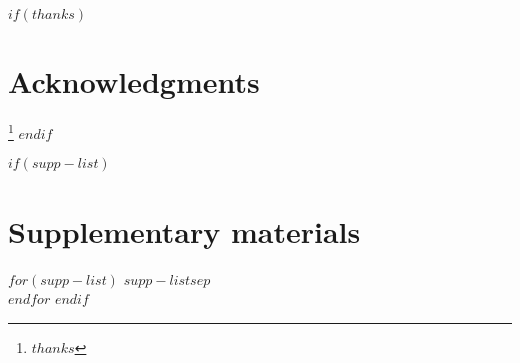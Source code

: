 $if(thanks)$
\section*{Acknowledgments}
\thanks{$thanks$}
$endif$

$if(supp-list)$
\section*{Supplementary materials}
$for(supp-list)$
$supp-list$$sep$\\
$endfor$
$endif$